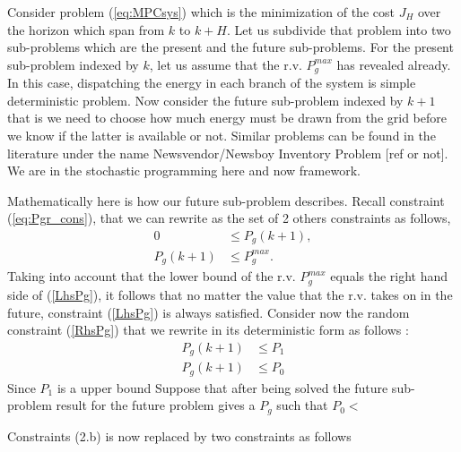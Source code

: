 \documentclass{ifacconf}
\begin{document}
Consider problem (\ref{eq:MPCsys}) which is the minimization of the cost $J_H$ over the horizon which span from $k$ to $k+H$. Let us subdivide that problem into two sub-problems which are the present and the future sub-problems. For the present sub-problem indexed by $k$, let us assume that the r.v. $P_g^{max}$ has revealed already. In this case, dispatching the energy in each branch of the system is simple deterministic problem. 
Now consider the future sub-problem indexed by $k+1$ that is we need to choose how much energy must be drawn from the grid before we know if the latter is available or not. Similar problems can be found in the literature under the name Newsvendor/Newsboy Inventory Problem [ref or not]. We are in the stochastic programming here and now framework. 

Mathematically here is how our future sub-problem describes. Recall constraint (\ref{eq:Pgr_cons}), that we can rewrite as the set of 2 others constraints as follows,
\begin{subequations}
    \begin{align}
        0 &\leq P_g(k+1) \label{LhsPg}, \\
        P_g(k+1) &\leq P_g^{max}. \label{RhsPg}
    \end{align}
\end{subequations}
Taking into account that the lower bound of the r.v. $P_g^{max}$ equals the right hand side of (\ref{LhsPg}), it follows that no matter the value that the r.v. takes on in the future, constraint  (\ref{LhsPg})  is always satisfied. Consider now the random constraint (\ref{RhsPg}) that we rewrite in its deterministic form as follows :
\begin{subequations}
    \begin{align}
        P_g (k+1) &\leq P_1 \label{Rhs1}\\
        P_g (k+1) & \leq P_0 \label{Rhs2}
    \end{align}
\end{subequations}
Since $P_1$ is a upper bound 
Suppose that after being solved the future sub-problem result for the future problem gives a $P_g$ such that $P_0< $

 
 Constraints (2.b) is now replaced by two constraints as follows
 
\end{document}
